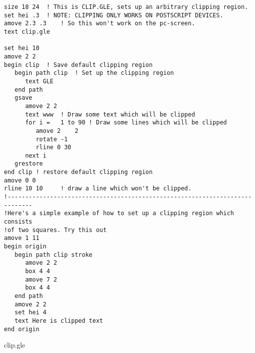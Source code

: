 \clearpage
\begin{center}
\begin{minipage}[t]{12.0cm}
{\scriptsize %
\begin{verbatim}
size 18 24	! This is CLIP.GLE, sets up an arbitrary clipping region.
set hei .3	! NOTE: CLIPPING ONLY WORKS ON POSTSCRIPT DEVICES.
amove 2.3 .3	! So this won't work on the pc-screen.
text clip.gle	

set hei 10
amove 2 2 
begin clip	! Save default clipping region
   begin path clip	! Set up the clipping region
      text GLE
   end path
   gsave
      amove 2 2 	
      text www	! Draw some text which will be clipped
      for i =	1 to 90	! Draw some lines which will be clipped
         amove 2	2 
         rotate -1
         rline 0 30
      next i
   grestore
end clip ! restore default clipping region
amove 0 0 
rline 10 10 	! draw a line which won't be clipped.
!-----------------------------------------------------------------------------
!Here's a simple example of how to set up a clipping region which consists
!of two squares. Try this out
amove 1 11
begin origin
   begin path clip stroke
      amove 2 2 
      box 4 4 
      amove 7 2 
      box 4 4 
   end path
   amove 2 2 
   set hei 4
   text Here is clipped text
end origin
\end{verbatim}
}
\hfill {\small clip.gle}\\
\end{minipage}

\end{center}
\vfill
